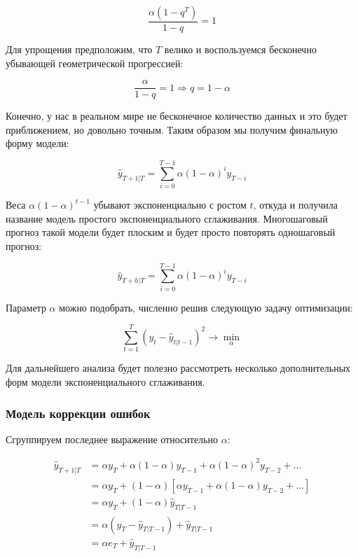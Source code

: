 \documentclass[12pt,fleqn]{article}
\begin{document}
\begin{equation}
  \frac{\alpha(1-q^T)}{1-q} = 1
\end{equation}

Для упрощения предположим, что $T$ велико и воспользуемся бесконечно убывающей геометрической прогрессией:

\begin{equation}
  \frac{\alpha}{1-q} = 1 \Rightarrow q = 1-\alpha
\end{equation}

Конечно, у нас в реальном мире не бесконечное количество данных и это будет приближением, но довольно точным.
Таким образом мы получим финальную форму модели:

\begin{equation}
  \hat{y}_{T+1|T} = \sum_{i=0}^{T-1} \alpha (1-\alpha)^{i} y_{T-i}
\end{equation}

Веса $ \alpha (1-\alpha)^{t-1} $ убывают экспоненциально с ростом $t$, откуда и получила название модель простого экспоненциального сглаживания.
Многошаговый прогноз такой модели будет плоским и будет просто повторять одношаговый прогноз:

\begin{equation}
  \hat{y}_{T+h|T} = \sum_{i=0}^{T-1} \alpha (1-\alpha)^{i} y_{T-i}
\end{equation}

Параметр $\alpha$ можно подобрать, численно решив следующую задачу оптимизации:

\begin{equation}
  \sum_{t=1}^{T}(y_t - \hat{y}_{t|t-1})^2 \rightarrow \min_\alpha
\end{equation}

Для дальнейшего анализа будет полезно рассмотреть несколько дополнительных форм модели экспоненциального сглаживания.

\subsubsection{Модель коррекции ошибок}

Сгруппируем последнее выражение относительно $\alpha$:

\begin{equation}
  \label{error_correction}
  \begin{split}
    \hat{y}_{T+1|T}
    &= \alpha y_T + \alpha (1-\alpha) y_{T-1} + \alpha (1-\alpha)^2 y_{T-2} + \ldots \\
    &= \alpha y_T +(1-\alpha)[ \alpha y_{T-1} + \alpha (1-\alpha) y_{T-2} + \ldots ] \\
    &= \alpha y_T +(1-\alpha) \hat{y}_{T|T-1} \\
    &= \alpha (y_T - \hat{y}_{T|T-1}) + \hat{y}_{T|T-1} \\
    &= \alpha e_T + \hat{y}_{T|T-1}
  \end{split}
\end{equation}
\end{document}
